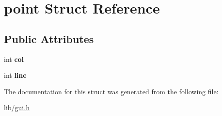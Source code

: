 \hypertarget{structpoint}{}\section{point Struct Reference}
\label{structpoint}
\subsection*{Public Attributes}
\begin{DoxyCompactItemize}
\item 
\mbox{\label{structpoint_a55412392e3a389e7c61e9c09868c5d42}} 
int {\bfseries col}
\item 
\mbox{\label{structpoint_a038657b3760e2df646afc28e59292adb}} 
int {\bfseries line}
\end{DoxyCompactItemize}


The documentation for this struct was generated from the following file\+:\begin{DoxyCompactItemize}
\item 
lib/\hyperlink{gui_8h}{gui.\+h}\end{DoxyCompactItemize}
